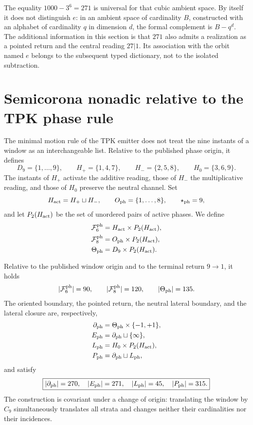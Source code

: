The equality \(1000-3^6=271\) is universal for that cubic ambient space. By
itself it does not distinguish \(e\): in an ambient space of cardinality \(B\), constructed with
an alphabet of cardinality \(q\) in dimension \(d\), the formal complement is
\(B-q^d\). The additional information in this section is that \(271\) also admits
a realization as a pointed return and the central reading \(27|1\).
Its association with the orbit named \(e\) belongs to the subsequent typed
dictionary, not to the isolated subtraction.

\section{Semicorona nonadic relative to the TPK phase rule}

The minimal motion rule of the TPK emitter does not treat the nine instants
of a window as an interchangeable list. Relative to the published phase
origin, it defines
\[
 D_9=\{1,\ldots,9\},
 \qquad
 H_+=\{1,4,7\},
 \qquad
 H_-=\{2,5,8\},
 \qquad
 H_0=\{3,6,9\}.
\]
The instants of \(H_+\) activate the additive reading, those of \(H_-\) the
multiplicative reading, and those of \(H_0\) preserve the neutral channel. Set
\[
 H_{\rm act}=H_+\sqcup H_-,
 \qquad
 O_{\rm ph}=\{1,\ldots,8\},
 \qquad
 \star_{\rm ph}=9,
\]
and let \(P_2(H_{\rm act})\) be the set of unordered pairs of active
phases. We define
\[
\begin{aligned}
 \mathcal F^{\rm ph}_6&=H_{\rm act}\times P_2(H_{\rm act}),\\
 \mathcal F^{\rm ph}_8&=O_{\rm ph}\times P_2(H_{\rm act}),\\
 \Theta_{\rm ph}&=D_9\times P_2(H_{\rm act}).
\end{aligned}
\]

\begin{theorem}
\label{thm:semicorona-fase-tpk}
Relative to the published window origin and to the terminal return
\(9\to1\), it holds
\[
 |\mathcal F^{\rm ph}_6|=90,
 \qquad
 |\mathcal F^{\rm ph}_8|=120,
 \qquad
 |\Theta_{\rm ph}|=135.
\]
The oriented boundary, the pointed return, the neutral lateral boundary, and the
lateral closure are, respectively,
\[
\begin{aligned}
 \partial_{\rm ph}&=\Theta_{\rm ph}\times\{-1,+1\},\\
 E_{\rm ph}&=\partial_{\rm ph}\sqcup\{\infty\},\\
 L_{\rm ph}&=H_0\times P_2(H_{\rm act}),\\
 P_{\rm ph}&=\partial_{\rm ph}\sqcup L_{\rm ph},
\end{aligned}
\]
and satisfy
\[
 \boxed{|\partial_{\rm ph}|=270,\quad
 |E_{\rm ph}|=271,\quad |L_{\rm ph}|=45,\quad
 |P_{\rm ph}|=315.}
\]
The construction is covariant under a change of origin: translating the window
by \(C_9\) simultaneously translates all strata and changes neither their
cardinalities nor their incidences.
\end{theorem}

